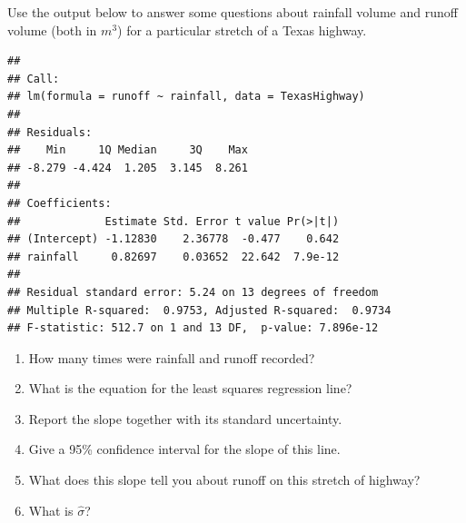 \documentclass[twoside]{book}
\makeatletter
\newenvironment{kframe}{%
 \def\at@end@of@kframe{}%
 \ifinner\ifhmode%
  \def\at@end@of@kframe{\end{minipage}}%
  \begin{minipage}{\columnwidth}%
 \fi\fi%
 \def\FrameCommand##1{\hskip\@totalleftmargin \hskip-\fboxsep
 \colorbox{shadecolor}{##1}\hskip-\fboxsep
     \hskip-\linewidth \hskip-\@totalleftmargin \hskip\columnwidth}%
 \MakeFramed {\advance\hsize-\width
   \@totalleftmargin\z@ \linewidth\hsize
   \@setminipage}}%
 {\par\unskip\endMakeFramed%
 \at@end@of@kframe}
\newenvironment{knitrout}{}{} %
\makeatother
\begin{document}
\begin{problem}
	Use the output below to answer some questions about rainfall volume  and 
	runoff volume (both in $m^3$) for a particular stretch of a Texas highway.
\begin{knitrout}
\color{fgcolor}\begin{kframe}
\begin{verbatim}
## 
## Call:
## lm(formula = runoff ~ rainfall, data = TexasHighway)
## 
## Residuals:
##    Min     1Q Median     3Q    Max 
## -8.279 -4.424  1.205  3.145  8.261 
## 
## Coefficients:
##             Estimate Std. Error t value Pr(>|t|)
## (Intercept) -1.12830    2.36778  -0.477    0.642
## rainfall     0.82697    0.03652  22.642  7.9e-12
## 
## Residual standard error: 5.24 on 13 degrees of freedom
## Multiple R-squared:  0.9753,	Adjusted R-squared:  0.9734 
## F-statistic: 512.7 on 1 and 13 DF,  p-value: 7.896e-12
\end{verbatim}
\end{kframe}
\end{knitrout}
	\begin{enumerate}
		\item
			How many times were rainfall and runoff recorded?
		\item
			What is the equation for the least squares regression line?
		\item
			Report the slope together with its standard uncertainty.
		\item
			Give a 95\% confidence interval for the slope of this line.
		\item
			What does this slope tell you about runoff on this
			stretch of highway?
		\item
			What is $\hat\sigma$?
	\end{enumerate}
\end{problem}
\end{document}
